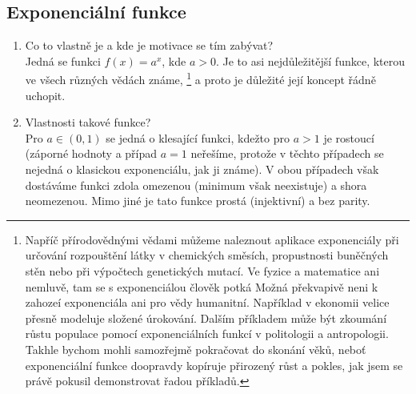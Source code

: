 \documentclass[11pt,a4paper]{article}
\begin{document}
    \subsection*{Exponenciální funkce}
        \begin{enumerate}

            \item Co to vlastně je a kde je motivace se tím zabývat?\\
            Jedná se funkci $f(x) = a^x$, kde $a>0$. Je to asi nejdůležitější funkce, kterou ve všech různých vědách známe,%
                \footnote{Napříč přírodovědnými vědami můžeme naleznout aplikace exponenciály při určování rozpouštění látky v chemických směsích, propustnosti buněčných stěn nebo při výpočtech genetických mutací. Ve fyzice a matematice ani nemluvě, tam se s exponenciálou člověk potká  Možná překvapivě neni k zahozeí exponenciála ani pro vědy humanitní. Například v ekonomii velice přesně modeluje složené úrokování. Dalším příkladem může být zkoumání růstu populace pomocí exponenciálních funkcí v politologii a antropologii. Takhle bychom mohli samozřejmě pokračovat do skonání věků, neboť exponenciální funkce doopravdy kopíruje přirozený růst a pokles, jak jsem se právě pokusil demonstrovat řadou příkladů.}
            a proto je důležité její koncept řádně uchopit.
            
            \item Vlastnosti takové funkce?\\
            Pro $a \in (0,1)$ se jedná o klesající funkci, kdežto pro $a > 1$ je rostoucí (záporné hodnoty a případ $a=1$ neřešíme, protože v těchto případech se nejedná o klasickou exponenciálu, jak ji známe). V obou případech však dostáváme funkci zdola omezenou (minimum však neexistuje) a shora neomezenou. Mimo jiné je tato funkce prostá (injektivní) a bez parity.
            

\end{enumerate}
\end{document}
